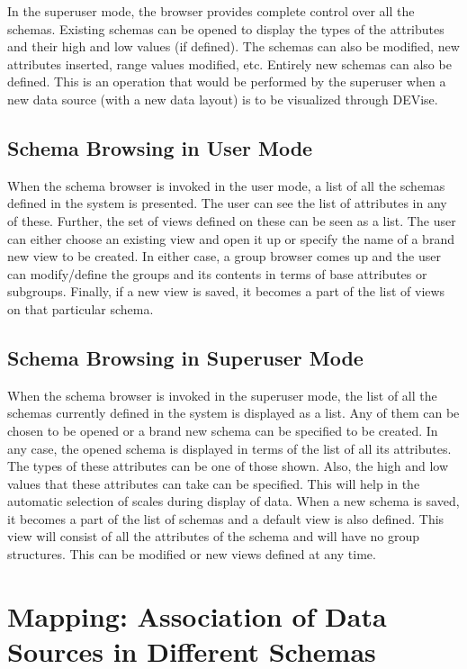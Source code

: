 In the superuser mode, the browser provides complete control over all
the schemas. Existing schemas can be opened to display the types of
the attributes and their high and low values (if defined). The schemas
can also be modified, new attributes inserted, range values modified,
etc. Entirely new schemas can also be defined.  This is an operation
that would be performed by the superuser when a new data source (with
a new data layout) is to be visualized through DEVise.

\subsection{Schema Browsing in User Mode}

When the schema browser is invoked in the user mode, a list of all the
schemas defined in the system is presented. The user can see the list
of attributes in any of these. Further, the set of views defined on
these can be seen as a list.  The user can either choose an existing
view and open it up or specify the name of a brand new view to be
created. In either case, a group browser comes up and the user can
modify/define the groups and its contents in terms of base attributes
or subgroups. Finally, if a new view is saved, it becomes a part of
the list of views on that particular schema.

\subsection{Schema Browsing in Superuser Mode}

When the schema browser is invoked in the superuser mode, the list of
all the schemas currently defined in the system is displayed as a
list. Any of them can be chosen to be opened or a brand new schema can
be specified to be created. In any case, the opened schema is
displayed in terms of the list of all its attributes. The types of
these attributes can be one of those shown. Also, the high and low
values that these attributes can take can be specified.  This will help in
the automatic selection of scales during display of data. When a new
schema is saved, it becomes a part of the list of schemas and a
default view is also defined.  This view will consist of all the
attributes of the schema and will have no group structures. This can
be modified or new views defined at any time.

\section{Mapping: Association of Data Sources in Different Schemas}

